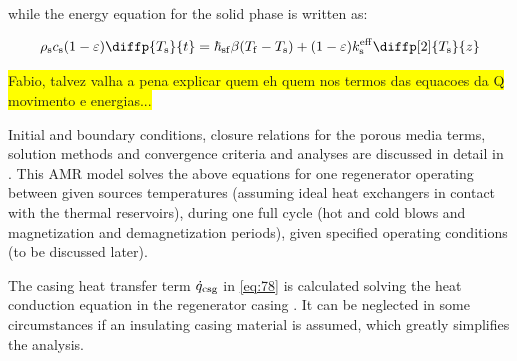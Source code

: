 \documentclass[referee]{svjour3}
\begin{document}




\noindent while the energy equation for the solid phase is written as:

\begin{equation}
\label{eq:88}
  \rho\ped{s} c\ped{s}(1 - \varepsilon)\diffp{T\ped{s}}{t} = \hheat\ped{sf}\beta(T\ped{f}-T\ped{s}) + (1-\varepsilon)k\ped{s}\ap{eff}\diffp[2]{T\ped{s}}{z}
\end{equation}

\colorbox{yellow}{Fabio, talvez valha a pena explicar quem eh quem nos termos das equacoes da Q movimento e energias...}


Initial and boundary conditions, closure relations for the porous media terms, solution methods and convergence criteria and analyses are discussed in detail in \cite{bib:trevizoli16_perfor_model}. This AMR model solves the above equations for one regenerator operating between given sources temperatures (assuming ideal heat exchangers in contact with the thermal reservoirs), during one full cycle (hot and cold blows and  magnetization and demagnetization periods), given specified operating conditions (to be discussed later).

The casing heat transfer term $\dot{q}_{\mathrm{csg}}$ in \autoref{eq:78} is calculated solving the heat conduction equation in the regenerator casing \cite{bib:trevizoli16_perfor_model}. It can be neglected in some circumstances if an insulating casing material is assumed, which greatly simplifies the analysis. %
\end{document}
